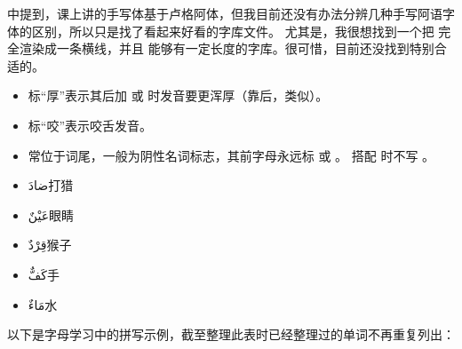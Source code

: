 \begin{note}
     中提到，课上讲的手写体基于卢格阿体，但我目前还没有办法分辨几种手写阿语字体的区别，所以只是找了看起来好看的字库文件。
    尤其是，我很想找到一个把  完全渲染成一条横线，并且  能够有一定长度的字库。很可惜，目前还没找到特别合适的。
\end{note}

\begin{itemize}
    \item 标``厚''表示其后加  或  时发音要更浑厚（靠后，类似\textipa{[A]}）。
    \item 标``咬''表示咬舌发音。
    \item {} 常位于词尾，一般为阴性名词标志，其前字母永远标  或  。 搭配  时不写 。
\end{itemize}

\begin{multicols}{2}
    \begin{itemize}
        \item \ac{ضادَ}{打猎}
        \item \ac{عَيْنٌ}{眼睛} 
        \item \ac{قِرْدٌ}{猴子}
        \item \ac{كَفٌّ}{手}
        \item \ac{مَاءٌ}{水}
    \end{itemize}
\end{multicols}

以下是字母学习中的拼写示例，截至整理此表时已经整理过的单词不再重复列出：

